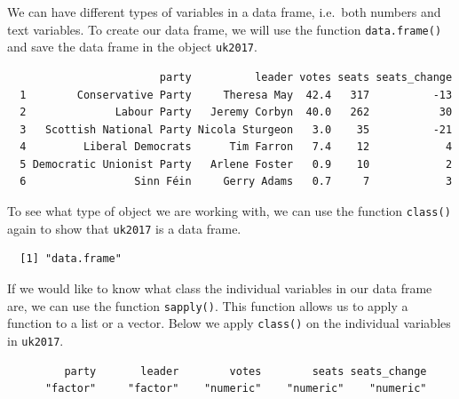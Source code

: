 \documentclass[12pt,oneside]{reedthesis}
\theoremstyle{definition}
\theoremstyle{definition}
\theoremstyle{definition}
\theoremstyle{remark}
\begin{document}
  We can have different types of variables in a data frame, i.e.~both
  numbers and text variables. To create our data frame, we will use the
  function \texttt{data.frame()} and save the data frame in the object
  \texttt{uk2017}.
  \begin{Shaded}
  \begin{Highlighting}[]
  \StringTok{ }
  
  \end{Highlighting}
  \end{Shaded}
  \begin{verbatim}
                        party          leader votes seats seats_change
  1        Conservative Party     Theresa May  42.4   317          -13
  2              Labour Party   Jeremy Corbyn  40.0   262           30
  3   Scottish National Party Nicola Sturgeon   3.0    35          -21
  4         Liberal Democrats      Tim Farron   7.4    12            4
  5 Democratic Unionist Party   Arlene Foster   0.9    10            2
  6                 Sinn Féin     Gerry Adams   0.7     7            3
  \end{verbatim}
  To see what type of object we are working with, we can use the function
  \texttt{class()} again to show that \texttt{uk2017} is a data frame.
  \begin{Shaded}
  \begin{Highlighting}[]
  \end{Highlighting}
  \end{Shaded}
  \begin{verbatim}
  [1] "data.frame"
  \end{verbatim}
  If we would like to know what class the individual variables in our data
  frame are, we can use the function \texttt{sapply()}. This function
  allows us to apply a function to a list or a vector. Below we apply
  \texttt{class()} on the individual variables in \texttt{uk2017}.
  \begin{Shaded}
  \begin{Highlighting}[]
  \end{Highlighting}
  \end{Shaded}
  \begin{verbatim}
         party       leader        votes        seats seats_change 
      "factor"     "factor"    "numeric"    "numeric"    "numeric" 
  \end{verbatim}
\end{document}
